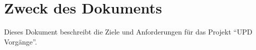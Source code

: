 \chapter{Zweck des Dokuments}

Dieses Dokument beschreibt die Ziele und Anforderungen für das Projekt “UPD Vorgänge”.

